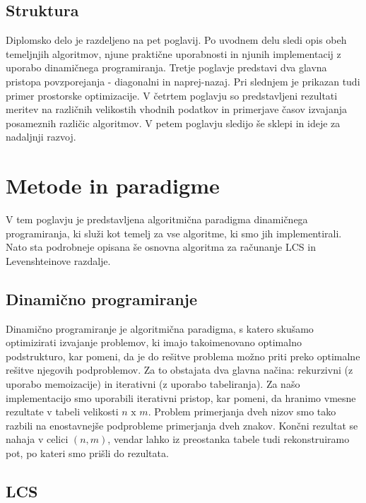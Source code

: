 \documentclass[a4paper,12pt,openright]{book}
\begin{document}
\section{Struktura}

Diplomsko delo je razdeljeno na pet poglavij. Po uvodnem delu sledi opis obeh temeljnjih algoritmov, njune praktične uporabnosti in njunih implementacij z uporabo dinamičnega programiranja. Tretje poglavje predstavi dva glavna pristopa povzporejanja - diagonalni in naprej-nazaj. Pri slednjem je prikazan tudi primer prostorske optimizacije. V četrtem poglavju so predstavljeni rezultati meritev na različnih velikostih vhodnih podatkov in primerjave časov izvajanja posameznih različic algoritmov. V petem poglavju sledijo še sklepi in ideje za nadaljnji razvoj. 

\chapter{Metode in paradigme}

V tem poglavju je predstavljena algoritmična paradigma dinamičnega programiranja, ki služi kot temelj za vse algoritme, ki smo jih implementirali. Nato sta podrobneje opisana še osnovna algoritma za računanje LCS in Levenshteinove razdalje. 

\section{Dinamično programiranje}

Dinamično programiranje je algoritmična paradigma, s katero skušamo optimizirati izvajanje problemov, ki imajo takoimenovano optimalno podstrukturo, kar pomeni, da je do rešitve problema možno priti preko optimalne rešitve njegovih podproblemov. Za to obstajata dva glavna načina: rekurzivni (z uporabo memoizacije) in iterativni (z uporabo tabeliranja). Za našo implementacijo smo uporabili iterativni pristop, kar pomeni, da hranimo vmesne rezultate v tabeli velikosti \begin{math}n \text{ x } m\end{math}. Problem primerjanja dveh nizov smo tako razbili na enostavnejše podprobleme primerjanja dveh znakov. Končni rezultat se nahaja v celici \begin{math}(n,m)\end{math}, vendar lahko iz preostanka tabele tudi rekonstruiramo pot, po kateri smo prišli do rezultata. 



\section{LCS}
\end{document}
